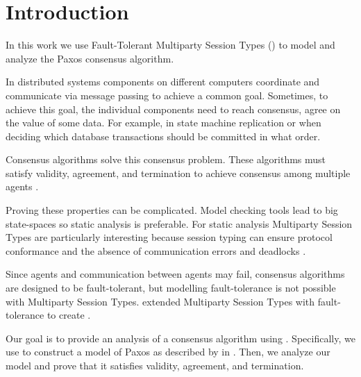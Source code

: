 \chapter{Introduction}
In this work we use Fault-Tolerant Multiparty Session Types (\FTMPST) to model and analyze the Paxos consensus algorithm.

In distributed systems components on different computers coordinate and communicate via message passing to achieve a common goal.
Sometimes, to achieve this goal, the individual components need to reach consensus, \ie agree on the value of some data.
For example, in state machine replication or when deciding which database transactions should be committed in what order.

Consensus algorithms solve this consensus problem.
These algorithms must satisfy validity, agreement, and termination to achieve consensus among multiple agents \cite{CoulourisEtal01}.

Proving these properties can be complicated.
Model checking tools lead to big state-spaces so static analysis is preferable.
For static analysis Multiparty Session Types are particularly interesting because session typing can ensure protocol conformance and the absence of communication errors and deadlocks \cite{ScalasEtal18}.

Since agents and communication between agents may fail, consensus algorithms are designed to be fault-tolerant, but modelling fault-tolerance is not possible with Multiparty Session Types.
\citeauthor{PetersEtal21} extended Multiparty Session Types with fault-tolerance to create \FTMPST.

Our goal is to provide an analysis of a consensus algorithm using \FTMPST.
Specifically, we use \FTMPST to construct a model of Paxos as described by \citeauthor{Lamport01} in \cite{Lamport01}.
Then, we analyze our model and prove that it satisfies validity, agreement, and termination.

